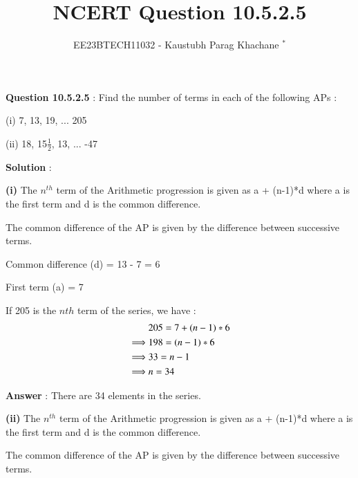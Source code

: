 \documentclass[journal,12pt,twocolumn]{IEEEtran}
\theoremstyle{remark}
\begin{document}

\vspace{3cm}

\Large\title{NCERT Question 10.5.2.5}
\large\author{EE23BTECH11032 - Kaustubh Parag Khachane $^{*}$%
}
\maketitle
\newpage
\bigskip

\renewcommand{\thefigure}{\theenumi}
\renewcommand{\thetable}{\theenumi}
\large\textbf{Question 10.5.2.5} : \normalsize Find the number of terms in each of the following APs : 

(i) 7, 13, 19, ... 205

(ii) 18, 15\(\frac{1}{2}\), 13, ... -47

\vspace{4mm} 

\large\textbf{Solution} :\normalsize

\vspace{4mm}

\textbf{(i)} The \(n^{th}\) term of the Arithmetic progression is given as a + (n-1)*d where a is the first term and d is the common difference.

The common difference of the AP is given by the difference between successive terms.

\vspace{4mm}

Common difference (d) = 13 - 7 = 6

First term (a) = 7

\vspace{4mm}

If 205 is the \(n{th}\) term of the series, we have :
\begin{align}
&205 = 7 + (n-1)*6 \notag\\ 
\implies&  198 = (n-1)*6 \notag\\
\implies&  33 = n-1\notag\\
\implies& n = 34\notag
\end{align}

\large\textbf{Answer} : \normalsize There are 34 elements in the series.

\vspace{4mm}

\textbf{(ii)} The \(n^{th}\) term of the Arithmetic progression is given as a + (n-1)*d where a is the first term and d is the common difference.

The common difference of the AP is given by the difference between successive terms.
\end{document}
